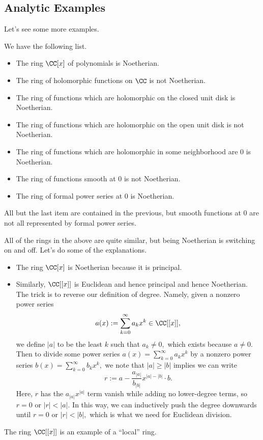 \subsection{Analytic Examples}
Let's see some more examples.
\begin{ex}
	We have the following list.
	\begin{itemize}
		\item The ring $\CC[x]$ of polynomials is Noetherian.
		\item The ring of holomorphic functions on $\CC$ is {\color{red}not} Noetherian.
		\item The ring of functions which are holomorphic on the closed unit disk is Noetherian.
		\item The ring of functions which are holomorphic on the open unit disk is {\color{red}not} Noetherian.
		\item The ring of functions which are holomorphic in some neighborhood are $0$ is Noetherian.
		\item The ring of functions smooth at $0$ is {\color{red}not} Noetherian.
		\item The ring of formal power series at $0$ is Noetherian.
	\end{itemize}
	All but the last item are contained in the previous, but smooth functions at $0$ are not all represented by formal power series.
\end{ex}
All of the rings in the above are quite similar, but being Noetherian is switching on and off. Let's do some of the explanations.
\begin{itemize}
	\item The ring $\CC[x]$ is Noetherian because it is principal.
	\item Similarly, $\CC[[x]]$ is Euclidean and hence principal and hence Noetherian. The trick is to reverse our definition of degree. Namely, given a nonzero power series
	\[a(x):=\sum_{k=0}^\infty a_kx^k\in\CC[[x]],\]
	we define $|a|$ to be the least $k$ such that $a_k\ne0,$ which exists because $a\ne0.$ Then to divide some power series $a(x)=\sum_{k=0}^\infty a_kx^k$ by a nonzero power series $b(x)=\sum_{k=0}^\infty b_kx^k,$ we note that $|a|\ge|b|$ implies we can write
	\[r:=a-\frac{a_{|a|}}{b_{|b|}}x^{|a|-|b|}\cdot b.\]
	Here, $r$ has the $a_{|a|}x^{|a|}$ term vanish while adding no lower-degree terms, so $r=0$ or $|r|<|a|.$ In this way, we can inductively push the degree downwards until $r=0$ or $|r|<|b|,$ which is what we need for Euclidean division.
\end{itemize}
\begin{remark}
	The ring $\CC[[x]]$ is an example of a ``local'' ring.
\end{remark}
